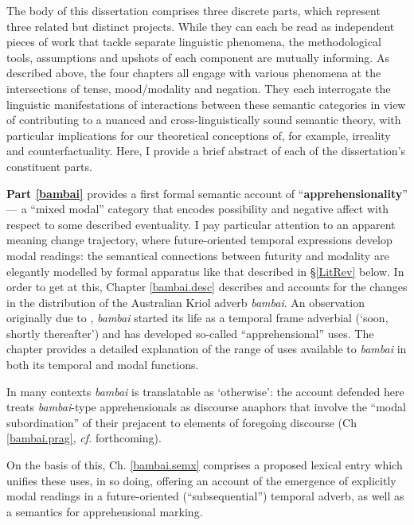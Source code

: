 \documentclass[12pt,dvipsnames]{report}
\begin{document}
The body of this dissertation comprises three discrete parts, which represent three related but distinct projects. While they can each be read as independent pieces of work that tackle separate linguistic phenomena, the methodological tools, assumptions and upshots of each component are mutually informing. As described above, the four chapters all engage with various phenomena at the intersections of tense, mood/modality and negation. They each interrogate the linguistic manifestations of interactions between these semantic categories in view of contributing to a nuanced and cross-linguistically sound semantic theory, with particular implications for our theoretical conceptions of, for example, irreality and counterfactuality. Here, I provide a brief abstract of each of the dissertation's constituent parts.


\textbf{Part \ref{bambai}} provides a first formal semantic account of ``\textbf{apprehensionality}'' --- a ``mixed modal'' category that encodes possibility and negative affect with respect to some described eventuality. I pay particular attention to an apparent meaning change trajectory, where future-oriented temporal expressions develop modal readings: the semantical connections between futurity and modality are elegantly modelled by formal apparatus like that described in \S \ref{LitRev} below. In order to get at this, Chapter \ref{bambai.desc} describes and accounts for the changes in the distribution of the Australian Kriol adverb \textit{bambai}. An observation originally due to \citet{Angelo2016,Angelo2018}, \textit{bambai} started its life as a temporal frame adverbial (`soon, shortly thereafter') and has developed so-called ``apprehensional'' uses. The chapter provides a detailed explanation of the range of uses available to \textit{bambai} in both its temporal and modal functions. 

In many contexts \textit{bambai} is translatable as `otherwise': the account defended here treats \textit{bambai}-type apprehensionals as discourse anaphors that involve the ``modal subordination'' of their prejacent to elements of foregoing discourse (Ch \ref{bambai.prag}, \textit{cf.} \citet{PhilKotek} forthcoming).

On the basis of this, Ch. \ref{bambai.semx} comprises a proposed lexical entry which unifies these uses, in so doing, offering an account of the emergence of explicitly modal readings in a future-oriented (``subsequential'') temporal adverb, as well as a semantics for apprehensional marking.%
\end{document}
